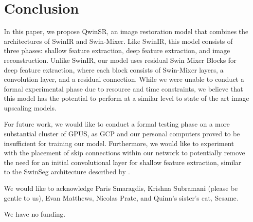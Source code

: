 \documentclass{article}
\begin{document}
\section{Conclusion}

In this paper, we propose QwinSR, an image restoration model that combines the architectures of SwinIR and Swin-Mixer. Like SwinIR, this model consists of three phases: shallow feature extraction, deep feature extraction, and image reconstruction. Unlike SwinIR, our model uses residual Swin Mixer Blocks for deep feature extraction, where each block consists of Swin-Mixer layers, a convolution layer, and a residual connection. While we were unable to conduct a formal experimental phase due to resource and time constraints, we believe that this model has the potential to perform at a similar level to state of the art image upscaling models.

For future work, we would like to conduct a formal testing phase on a more substantial cluster of GPUS, as GCP and our personal computers proved to be insufficient for training our model. Furthermore, we would like to experiment with the placement of skip connections within our network to potentially remove the need for an initial convolutional layer for shallow feature extraction, similar to the SwinSeg architecture described by \citet{SwinSeg}.


\begin{ack}
    We would like to acknowledge Paris Smaragdis, Krishna Subramani (please be gentle to us), Evan Matthews, Nicolas Prate, and Quinn’s sister’s cat, Sesame.

    We have no funding.
\end{ack}


\end{document}
